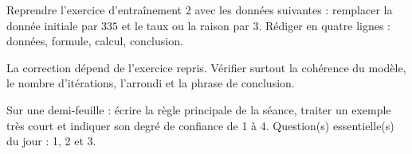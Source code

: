 
    \begin{homework}Reprendre l'exercice d'entraînement 2 avec les données suivantes : remplacer la donnée initiale par $335$ et le taux ou la raison par $3$. Rédiger en quatre lignes : données, formule, calcul, conclusion.\end{homework}
    \begin{solution}La correction dépend de l'exercice repris. Vérifier surtout la cohérence du modèle, le nombre d'itérations, l'arrondi et la phrase de conclusion.\end{solution}

    \begin{exitticket}[3 minutes]Sur une demi-feuille : écrire la règle principale de la séance, traiter un exemple très court et indiquer son degré de confiance de 1 à 4. Question(s) essentielle(s) du jour : 1, 2 et 3.\end{exitticket}

